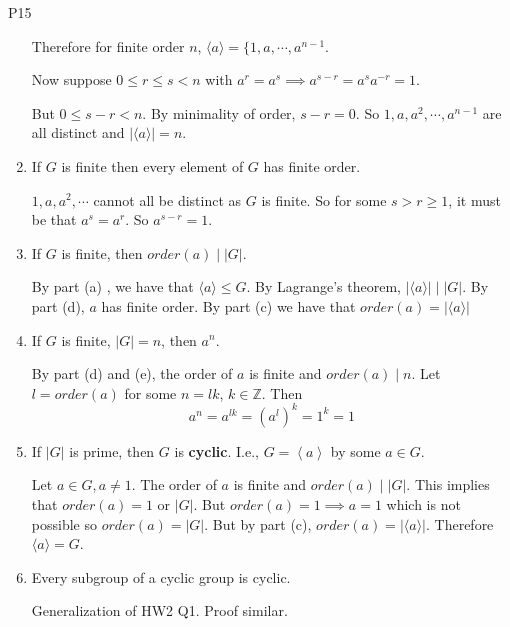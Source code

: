 \documentclass{article}
\begin{document}
\begin{cprop}{P15}{}
\begin{enumerate}
\begin{cpf}
                Therefore for finite order $n$, $ \langle a \rangle = \{1, a, \cdots, a^{n-1}$. 

                Now suppose $0 \leq r \leq s < n$ with $a^{r} = a^s \implies a^{s-r} = a^{s}a^{-r} = 1$. 

                But $0 \leq s-r < n$. By minimality of order, $s-r = 0$. So $1, a, a^2, \cdots, a^{n-1}$ are all distinct and $| \langle a \rangle| = n$.
            \end{cpf}
        \item If $G$ is finite then every element of $G$ has finite order.
            \begin{cpf}
                $1, a, a^2, \cdots$ cannot all be distinct as $G$ is finite. So for some $s > r \geq 1$, it must be that $a^{s} = a^{r}$. So $ a^{s-r} = 1$. 
            \end{cpf}
        \item If $G$ is finite, then $order(a) \mid |G|$.
            \begin{cpf}
                By part (a) , we have that $ \langle a \rangle \leq G$. By Lagrange's theorem, $ |\langle a \rangle| \mid |G|$. By part (d), $a$ has finite order.  By part (c) we have that $order(a) = | \langle a \rangle|$
            \end{cpf}
        \item If $G$ is finite, $|G| = n$, then $a^{n}$. 
            \begin{cpf}
                By part (d) and (e), the order of $a$ is finite and $order(a) \mid n$. Let $l = order(a)$ for some $n = lk$, $k \in \mathbb{Z}$. Then
                \[
                    a^{n} = a^{lk} = \left( a^l \right)^k = 1^k = 1
                \]
            \end{cpf}
        \item If $|G|$ is prime, then $G$ is \textbf{cyclic}. I.e., $G =  \left\langle a  \right\rangle $ by some $a \in G$.
            \begin{cpf}
                Let $a \in G, a \neq 1$. The order of $a$ is finite and $order(a) \mid |G|$. This implies that $order(a) = 1$ or $|G|$. But $order(a) = 1 \implies a = 1$ which is not possible so $order(a) = |G|$. But by part (c), $order(a) = | \langle a \rangle|$. Therefore $ \langle a \rangle = G$. 
            \end{cpf}
        \item Every subgroup of a cyclic group is cyclic.
            \begin{cpf}{}{}
                Generalization of HW2 Q1. Proof similar.

\end{cpf}
\end{enumerate}
\end{cprop}
\end{document}
